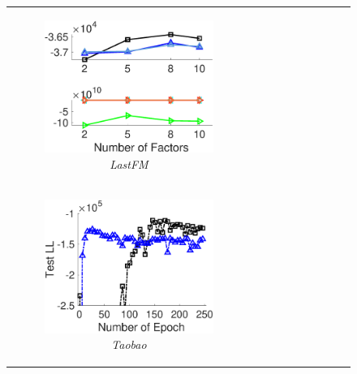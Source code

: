 \begin{figure}
\begin{tabular}[c]{cccc}
\begin{subfigure}[t]{0.25\textwidth}
			\includegraphics[width=\textwidth]{./figs/lastfm_ll.eps}
			\caption{\textit{LastFM}}
		\end{subfigure} \cmt{\\
		\begin{subfigure}[t]{0.25\linewidth}
			\centering
			\includegraphics[width=\linewidth]{./figs/taobao_ll_epoch.eps}
			\caption{\textit{Taobao}}
		\end{subfigure} 
		&
		\begin{subfigure}[t]{0.25\linewidth}
			\centering

\end{subfigure}}
\end{tabular}
\end{figure}
